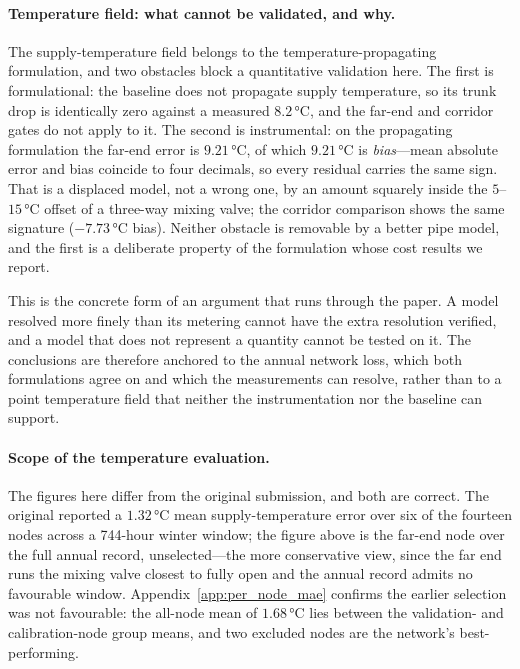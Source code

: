 \paragraph{Temperature field: what cannot be validated, and why.}
The supply-temperature field belongs to the temperature-propagating formulation, and two
obstacles block a quantitative validation here. The first is formulational: the baseline does
not propagate supply temperature, so its trunk drop is identically zero against a measured
$8.2$\,°C, and the far-end and corridor gates do not apply to it. The second is instrumental:
on the propagating formulation the far-end error is $9.21$\,°C, of which $9.21$\,°C is
\emph{bias}---mean absolute error and bias coincide to four decimals, so every residual
carries the same sign. That is a displaced model, not a wrong one, by an amount squarely
inside the $5$--$15$\,°C offset of a three-way mixing valve; the corridor comparison shows the
same signature ($-7.73$\,°C bias). Neither obstacle is removable by a better pipe model, and
the first is a deliberate property of the formulation whose cost results we report.

This is the concrete form of an argument that runs through the paper. A model resolved more
finely than its metering cannot have the extra resolution verified, and a model that does
not represent a quantity cannot be tested on it. The conclusions are therefore anchored to
the annual network loss, which both formulations agree on and which the measurements can
resolve, rather than to a point temperature field that neither the instrumentation nor the
baseline can support.

\paragraph{Scope of the temperature evaluation.}
The figures here differ from the original submission, and both are correct. The original
reported a $1.32$\,°C mean supply-temperature error over six of the fourteen nodes across a
744-hour winter window; the figure above is the far-end node over the full annual record,
unselected---the more conservative view, since the far end runs the mixing valve closest to
fully open and the annual record admits no favourable window. Appendix~\ref{app:per_node_mae}
confirms the earlier selection was not favourable: the all-node mean of $1.68$\,°C lies
between the validation- and calibration-node group means, and two excluded nodes are the
network's best-performing.


